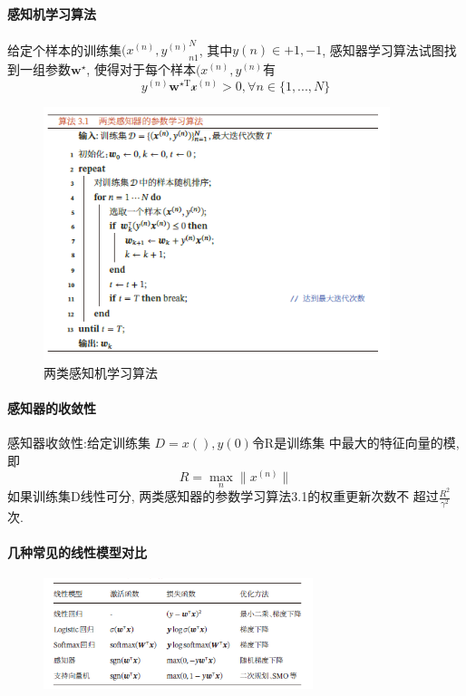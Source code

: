 \documentclass[a4paper]{article}
\begin{document}
\paragraph{感知机学习算法} 给定个样本的训练集${(x^{(n)}, y^{(n)}}^N_{n1}$, 其中$y(n)\in {+1, -1}$, 感知器学习算法试图找到一组参数$\mathbf{w}^{\star}$, 使得对于每个样本$(x^{(n)}, y^{(n)}$有
\begin{equation}
    y^{(n)} \mathbf{w}^{\star \mathrm{T} }  \mathcal{x}^{(n)}> 0,  \forall n \in \{ 1, ..., N \}
\end{equation}
\begin{figure}
    \centering
    \label{algorithm_perceptron}
    \includegraphics[width=0.9\textwidth]{algorithm_perceptron.png}
    \caption{两类感知机学习算法 }
\end{figure}

\paragraph{感知器的收敛性} 
 感知器收敛性:给定训练集 $D = {x(), y(0)}$令R是训练集
中最大的特征向量的模, 即$$R = \max_n \|x^{(n)}\|$$
如果训练集D线性可分, 两类感知器的参数学习算法3.1的权重更新次数不
超过$\frac{R^2}{\gamma^2}$次.

\paragraph{几种常见的线性模型对比} 
\begin{figure}
    \centering
    \includegraphics[width=0.7\textwidth]{linear_model.png}
    
\end{figure}
\newpage
\end{document}
